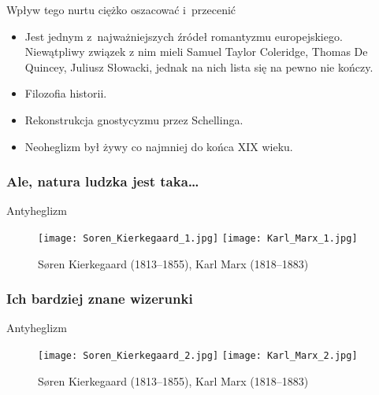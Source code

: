 \documentclass{beamer}  %
\begin{document}
\begin{frame}
  \begin{block}{Wpływ tego nurtu ciężko oszacować i~przecenić}
    \begin{itemize}
    \item Jest jednym z~najważniejszych źródeł romantyzmu
      europejskiego. Niewątpliwy związek z nim mieli Samuel Taylor
      Coleridge, Thomas De Quincey, Juliusz Słowacki, jednak na nich
      lista się na pewno nie kończy.
    \item Filozofia historii.
    \item Rekonstrukcja gnostycyzmu przez Schellinga.
    \item Neoheglizm był żywy co najmniej do końca XIX wieku.
    \end{itemize}
  \end{block}

\end{frame}



\begin{frame}
  \frametitle{Ale, natura ludzka jest taka\ldots}
  \pause

  \begin{block}{Antyheglizm}
    \begin{figure}
      \centering

      \texttt{[image: Soren\_Kierkegaard\_1.jpg]}
      \texttt{[image: Karl\_Marx\_1.jpg]}
      \pause

      \caption{Søren Kierkegaard (1813--1855), Karl Marx (1818--1883)}
    \end{figure}
  \end{block}

\end{frame}



\begin{frame}
  \frametitle{Ich bardziej znane wizerunki}

  \begin{block}{Antyheglizm}
    \begin{figure}
      \centering

      \texttt{[image: Soren\_Kierkegaard\_2.jpg]}
      \texttt{[image: Karl\_Marx\_2.jpg]}
      \caption{Søren Kierkegaard (1813--1855), Karl Marx (1818--1883)}
    \end{figure}
  \end{block}

\end{frame}
\end{document}
